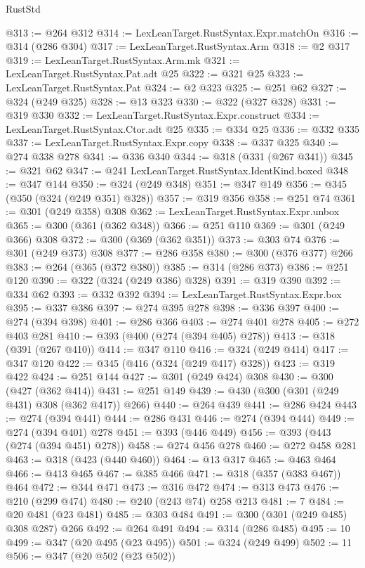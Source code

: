 \begin{lexlean}{RustStd}
\begin{coremodule}
@313 := @264 @312
@314 := LexLeanTarget.RustSyntax.Expr.matchOn
@316 := @314 (@286 @304)
@317 := LexLeanTarget.RustSyntax.Arm
@318 := @2 @317
@319 := LexLeanTarget.RustSyntax.Arm.mk
@321 := LexLeanTarget.RustSyntax.Pat.adt @25
@322 := @321 @25
@323 := LexLeanTarget.RustSyntax.Pat
@324 := @2 @323
@325 := @251 @62
@327 := @324 (@249 @325)
@328 := @13 @323
@330 := @322 (@327 @328)
@331 := @319 @330
@332 := LexLeanTarget.RustSyntax.Expr.construct
@334 := LexLeanTarget.RustSyntax.Ctor.adt @25
@335 := @334 @25
@336 := @332 @335
@337 := LexLeanTarget.RustSyntax.Expr.copy
@338 := @337 @325
@340 := @274 @338 @278
@341 := @336 @340
@344 := @318 (@331 (@267 @341))
@345 := @321 @62
@347 := @241 LexLeanTarget.RustSyntax.IdentKind.boxed
@348 := @347 @144
@350 := @324 (@249 @348)
@351 := @347 @149
@356 := @345 (@350 (@324 (@249 @351) @328))
@357 := @319 @356
@358 := @251 @74
@361 := @301 (@249 @358) @308
@362 := LexLeanTarget.RustSyntax.Expr.unbox
@365 := @300 (@361 (@362 @348))
@366 := @251 @110
@369 := @301 (@249 @366) @308
@372 := @300 (@369 (@362 @351))
@373 := @303 @74
@376 := @301 (@249 @373) @308
@377 := @286 @358
@380 := @300 (@376 @377) @266
@383 := @264 (@365 (@372 @380))
@385 := @314 (@286 @373)
@386 := @251 @120
@390 := @322 (@324 (@249 @386) @328)
@391 := @319 @390
@392 := @334 @62
@393 := @332 @392
@394 := LexLeanTarget.RustSyntax.Expr.box
@395 := @337 @386
@397 := @274 @395 @278
@398 := @336 @397
@400 := @274 (@394 @398)
@401 := @286 @366
@403 := @274 @401 @278
@405 := @272 @403 @281
@410 := @393 (@400 (@274 (@394 @405) @278))
@413 := @318 (@391 (@267 @410))
@414 := @347 @110
@416 := @324 (@249 @414)
@417 := @347 @120
@422 := @345 (@416 (@324 (@249 @417) @328))
@423 := @319 @422
@424 := @251 @144
@427 := @301 (@249 @424) @308
@430 := @300 (@427 (@362 @414))
@431 := @251 @149
@439 := @430 (@300 (@301 (@249 @431) @308 (@362 @417)) @266)
@440 := @264 @439
@441 := @286 @424
@443 := @274 (@394 @441)
@444 := @286 @431
@446 := @274 (@394 @444)
@449 := @274 (@394 @401) @278
@451 := @393 (@446 @449)
@456 := @393 (@443 (@274 (@394 @451) @278))
@458 := @274 @456 @278
@460 := @272 @458 @281
@463 := @318 (@423 (@440 @460))
@464 := @13 @317
@465 := @463 @464
@466 := @413 @465
@467 := @385 @466
@471 := @318 (@357 (@383 @467)) @464
@472 := @344 @471
@473 := @316 @472
@474 := @313 @473
@476 := @210 (@299 @474)
@480 := @240 (@243 @74) @258 @213
@481 := 7
@484 := @20 @481 (@23 @481)
@485 := @303 @484
@491 := @300 (@301 (@249 @485) @308 @287) @266
@492 := @264 @491
@494 := @314 (@286 @485)
@495 := 10
@499 := @347 (@20 @495 (@23 @495))
@501 := @324 (@249 @499)
@502 := 11
@506 := @347 (@20 @502 (@23 @502))

\end{coremodule}
\end{lexlean}
